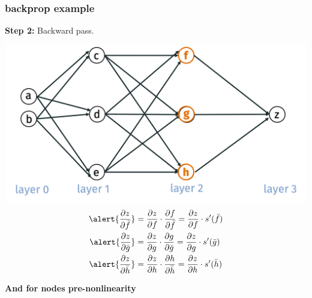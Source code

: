 \documentclass[handout,compress]{beamer}
\begin{document}
	\begin{frame}[t]
	\frametitle{backprop example}
	\small
	\textbf{Step 2:} Backward pass.
	
	\includegraphics[width=.5\textwidth]{nodes1.png}
	\begin{align*}
	\alert{\frac{\partial z}{\partial \bar{f}}} &= \frac{\partial z}{\partial {f}} \cdot \frac{\partial f}{\partial {\bar{f}}} = \frac{\partial z}{\partial {f}}\cdot s'(\bar{f}) \\
		\alert{\frac{\partial z}{\partial \bar{g}}} &= \frac{\partial z}{\partial {g}} \cdot \frac{\partial g}{\partial {\bar{g}}} = \frac{\partial z}{\partial {g}}\cdot s'(\bar{g}) \\
			\alert{\frac{\partial z}{\partial \bar{h}}} &= \frac{\partial z}{\partial {h}} \cdot \frac{\partial h}{\partial {\bar{h}}} = \frac{\partial z}{\partial {h}}\cdot s'(\bar{h}) \\
	\end{align*}
	\vspace{-3em}
	
	\begin{center}
		\textbf{\alert{And for nodes pre-nonlinearity}}
	\end{center}
\end{frame}
	
\end{document}
